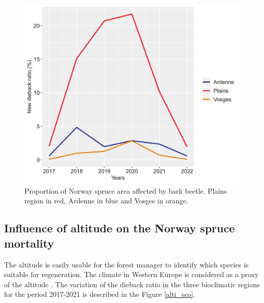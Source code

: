\documentclass[3p,procedia]{elsarticle}
\begin{document}
\begin{figure}[htbp] 
   \centering
   \includegraphics[width=0.6 \textwidth]{Annual_evol_Ardennes_vosges_plaines.png}
    \caption{Proportion of Norway spruce area affected by bark beetle. Plains region in red, Ardenne in blue and Vosges in orange. }
    \label{evol_gen}
\end{figure}

    
\subsection{ Influence of altitude on the Norway spruce mortality}
The altitude is easily usable for the forest manager to identify which species is suitable for regeneration.
The climate in Western Europe is considered as a proxy of the altitude \citep{faccoli_composition_2014}. 
The variation of the dieback ratio in the three bioclimatic regions for the period 2017-2021 is described in the Figure \ref{alti_sco}.
\end{document}
